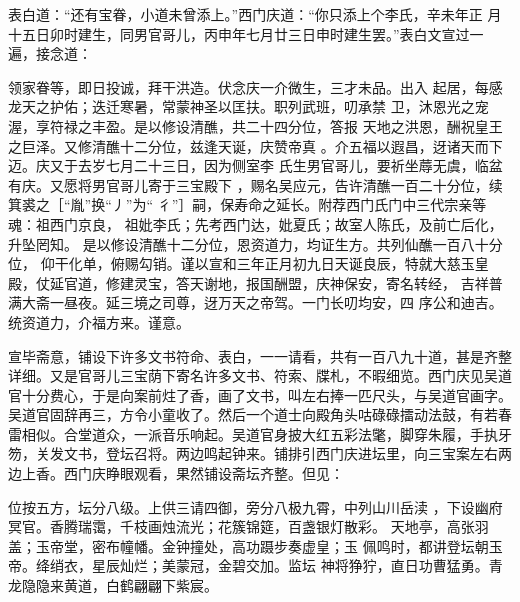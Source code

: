 表白道：“还有宝眷，小道未曾添上。”西门庆道：“你只添上个李氏，辛未年正
月十五日卯时建生，同男官哥儿，丙申年七月廿三日申时建生罢。”表白文宣过一
遍，接念道：

领家眷等，即日投诚，拜干洪造。伏念庆一介微生，三才未品。出入
起居，每感龙天之护佑；迭迁寒暑，常蒙神圣以匡扶。职列武班，叨承禁
卫，沐恩光之宠渥，享符禄之丰盈。是以修设清醮，共二十四分位，答报
天地之洪恩，酬祝皇王之巨泽。又修清醮十二分位，兹逢天诞，庆赞帝真
。介五福以遐昌，迓诸天而下迈。庆又于去岁七月二十三日，因为侧室李
氏生男官哥儿，要祈坐蓐无虞，临盆有庆。又愿将男官哥儿寄于三宝殿下
，赐名吴应元，告许清醮一百二十分位，续箕裘之［“胤”换“丿”为“
彳”］嗣，保寿命之延长。附荐西门氏门中三代宗亲等魂：祖西门京良，
祖妣李氏；先考西门达，妣夏氏；故室人陈氏，及前亡后化，升坠罔知。
是以修设清醮十二分位，恩资道力，均证生方。共列仙醮一百八十分位，
仰干化单，俯赐勾销。谨以宣和三年正月初九日天诞良辰，特就大慈玉皇
殿，仗延官道，修建灵宝，答天谢地，报国酬盟，庆神保安，寄名转经，
吉祥普满大斋一昼夜。延三境之司尊，迓万天之帝驾。一门长叨均安，四
序公和迪吉。统资道力，介福方来。谨意。

宣毕斋意，铺设下许多文书符命、表白，一一请看，共有一百八九十道，甚是齐整
详细。又是官哥儿三宝荫下寄名许多文书、符索、牒札，不暇细览。西门庆见吴道
官十分费心，于是向案前炷了香，画了文书，叫左右捧一匹尺头，与吴道官画字。
吴道官固辞再三，方令小童收了。然后一个道士向殿角头咕碌碌擂动法鼓，有若春
雷相似。合堂道众，一派音乐响起。吴道官身披大红五彩法氅，脚穿朱履，手执牙
笏，关发文书，登坛召将。两边鸣起钟来。铺排引西门庆进坛里，向三宝案左右两
边上香。西门庆睁眼观看，果然铺设斋坛齐整。但见：

位按五方，坛分八级。上供三请四御，旁分八极九霄，中列山川岳渎
，下设幽府冥官。香腾瑞霭，千枝画烛流光；花簇锦筵，百盏银灯散彩。
天地亭，高张羽盖；玉帝堂，密布幢幡。金钟撞处，高功蹑步奏虚皇；玉
佩鸣时，都讲登坛朝玉帝。绛绡衣，星辰灿烂；美蒙冠，金碧交加。监坛
神将狰狞，直日功曹猛勇。青龙隐隐来黄道，白鹤翩翩下紫宸。

